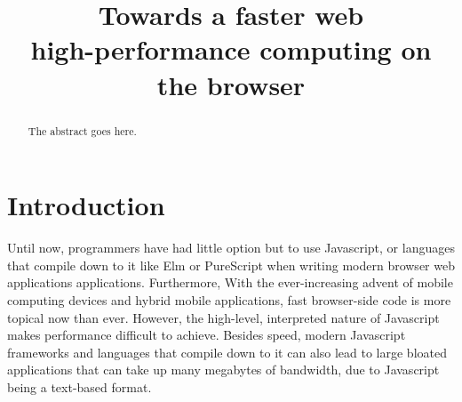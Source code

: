 \documentclass[conference]{IEEEtran}
\begin{document}
\title{Towards a faster web\\high-performance computing on the browser}

\author{
\and
{}
}

\maketitle

\begin{abstract}
The abstract goes here.
\end{abstract}

\section{Introduction}
Until now, programmers have had little option but to use Javascript, or
languages that compile down to it like Elm or PureScript when writing modern
browser web applications applications. Furthermore, With the ever-increasing
advent of mobile computing devices and hybrid mobile applications, fast
browser-side code is more topical now than ever. However, the high-level,
interpreted nature of Javascript makes performance difficult to achieve.
Besides speed, modern Javascript frameworks and languages that compile down to
it can also lead to large bloated applications that can take up many megabytes
of bandwidth, due to Javascript being a text-based format.
\end{document}
